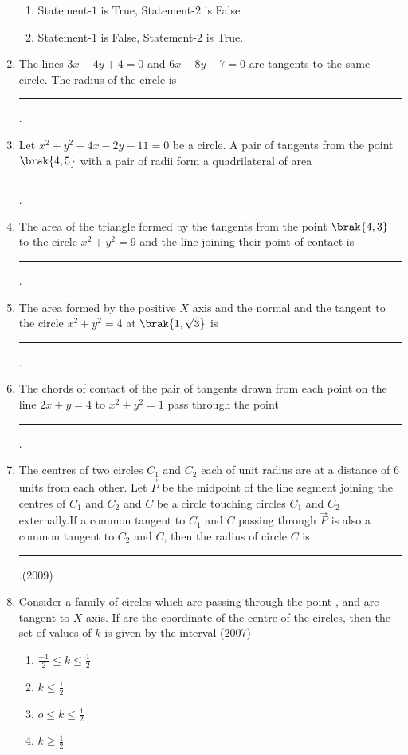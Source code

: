 \begin{enumerate}
\begin{enumerate}
\item Statement-$1$ is True,  Statement-$2$ is False
\item Statement-$1$ is False,  Statement-$2$ is True.
\end{enumerate}
%
\item The lines $3x-4y+4=0$ and $6x-8y-7=0$ are tangents to the same circle. The radius of the circle is \rule{1cm}{0.01pt}.
	\hfill{}
\item Let $x^{2}+y^{2}-4x-2y-11=0$ be a circle. A pair of tangents from the point $\brak{4, 5}$ with a pair of radii form a quadrilateral of area
\rule{1cm}{0.01pt}.
%
	\hfill{}
\item The area of the triangle formed by the tangents from the point $\brak{4, 3}$ to the circle $x^{2}+y^{2}=9$ and the line joining their point of contact is
\rule{1cm}{0.01pt}.
%
	\hfill{}
\item The area formed by the positive $X$ axis and the normal and the tangent to the circle $x^{2}+y^{2}=4$ at $\brak{1, \sqrt{3}}$ is
\rule{1cm}{0.01pt}.
%
	\hfill{}
\item The chords of contact of the pair of tangents drawn from each point on the line $2x+y=4$ to $x^{2}+y^{2}=1$ pass through the point \rule{1cm}{0.01pt}.
%
	\hfill{}
\item The centres of two circles $C_1$ and $C_2$ each of unit radius are at a distance of $6$ units from each other. Let $\vec{P}$ be the midpoint of the line segment joining the centres of $C_1$ and $C_2$ and $C$ be a circle touching circles $C_1$ and $C_2$ externally.If a common tangent to $C_1$ and $C$ passing through $\vec{P}$ is also a common tangent to $C_2$ and $C$,  then the radius of circle $C$ is  \rule{1cm}{0.01pt}.\hfill(2009)
\item Consider a family of circles which are passing through the point ,  and are tangent to $X$ axis. If  are the coordinate of the centre of the circles,  then the set of values of $k$ is given by the interval
\hfill{(2007)}
\begin{multicols}{4}
\begin{enumerate}
\item $\frac{-1}{2} \le k \le \frac{1}{2}$
\item $k \le \frac{1}{2}$
\item $o \le k \le \frac{1}{2}$
\item $k \ge \frac{1}{2}$
\end{enumerate}
\end{multicols}

\end{enumerate}
